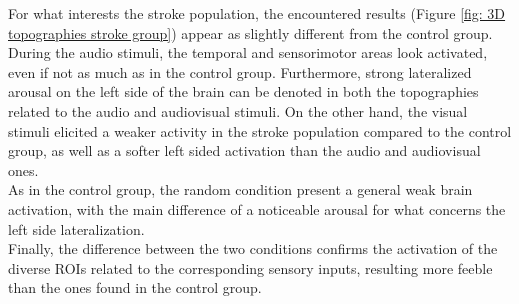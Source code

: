 For what interests the stroke population, the encountered results (Figure \ref{fig: 3D topographies stroke group}) appear as slightly different from the control group. During the audio stimuli, the temporal and sensorimotor areas look activated, even if not as much as in the control group. Furthermore, strong lateralized arousal on the left side of the brain can be denoted in both the topographies related to the audio and audiovisual stimuli. On the other hand, the visual stimuli elicited a weaker activity in the stroke population compared to the control group, as well as a softer left sided activation than the audio and audiovisual ones. \\
As in the control group, the random condition present a general weak brain activation, with the main difference of a noticeable arousal for what concerns the left side lateralization. \\
Finally, the difference between the two conditions confirms the activation of the diverse ROIs related to the corresponding sensory inputs, resulting more feeble than the ones found in the control group. 
